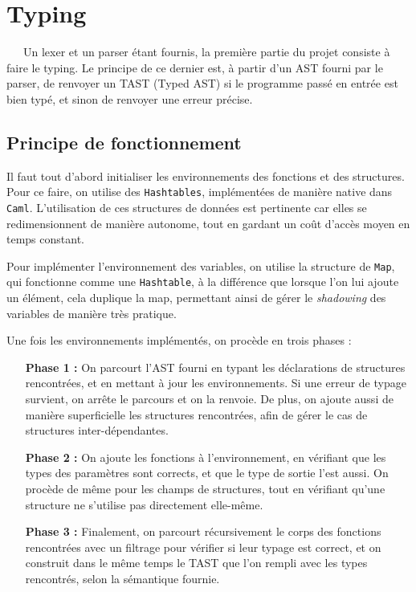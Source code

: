 \documentclass[11pt,a4paper]{article}
\begin{document}
\section{Typing}
\ \ \ Un lexer et un parser étant fournis, la première partie du projet consiste à faire le typing. Le principe de ce dernier est, à partir d'un AST fourni par le parser, de renvoyer un TAST (Typed AST) si le programme passé en entrée est bien typé, et sinon de renvoyer une erreur précise.
\subsection{Principe de fonctionnement}
	Il faut tout d'abord initialiser les environnements des fonctions et des structures. Pour ce faire, on utilise des \verb|Hashtables|, implémentées de manière native dans \verb|Caml|. L'utilisation de ces structures de données est pertinente car elles se redimensionnent de manière autonome, tout en gardant un coût d'accès moyen en temps constant.

	Pour implémenter l'environnement des variables, on utilise la structure de \verb|Map|, qui fonctionne comme une \verb|Hashtable|, à la différence que lorsque l'on lui ajoute un élément, cela duplique la map, permettant ainsi de gérer le \textit{shadowing} des variables de manière très pratique. \
	
Une fois les environnements implémentés, on procède en trois phases : \
\begin{itemize}
\item[\textbf{Phase 1 :}] On parcourt l'AST fourni en typant les déclarations de structures rencontrées, et en mettant à jour les environnements. Si une erreur de typage survient, on arrête le parcours et on la renvoie. De plus, on ajoute aussi de manière superficielle les structures rencontrées, afin de gérer le cas de structures inter-dépendantes. \
\item[\textbf{Phase 2 :}] On ajoute les fonctions à l'environnement, en vérifiant que les types des paramètres sont corrects, et que le type de sortie l'est aussi. On procède de même pour les champs de structures, tout en vérifiant qu'une structure ne s'utilise pas directement elle-même.
\item[\textbf{Phase 3 :}] Finalement, on parcourt récursivement le corps des fonctions rencontrées avec un filtrage pour vérifier si leur typage est correct, et on construit dans le même temps le TAST que l'on rempli avec les types rencontrés, selon la sémantique fournie.
\end{itemize}
\end{document}
